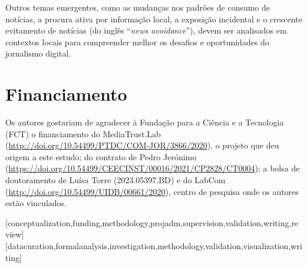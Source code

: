 \documentclass[portuguese]{textolivre}
\begin{document}
Outros temas emergentes, como as mudanças nos padrões de consumo de notícias, a procura ativa por informação local, a exposição incidental e o crescente evitamento de notícias (do inglês “\textit{news avoidance}”), devem ser analisados em contextos locais para compreender melhor os desafios e oportunidades do jornalismo digital.

\section{Financiamento}
Os autores gostariam de agradecer à Fundação para a Ciência e a Tecnologia (FCT) o financiamento do MediaTrust.Lab (\url{http://doi.org/10.54499/PTDC/COM-JOR/3866/2020}), o projeto que deu origem a este estudo; do contrato de Pedro Jerónimo (\url{https://doi.org/10.54499/CEECINST/00016/2021/CP2828/CT0004}); a bolsa de doutoramento de Luísa Torre (2023.05397.BD) e do LabCom (\url{http://doi.org/10.54499/UIDB/00661/2020}), centro de pesquisa onde os autores estão vinculados. 

\printbibliography\label{sec-bib}

\begin{contributors}
[conceptualization,funding,methodology,projadm,supervision,validation,writing,review]
[datacuration,formalanalysis,investigation,methodology,validation,visualization,writing]
\end{contributors}

\begin{dataavailability}
\end{dataavailability}
\end{document}
